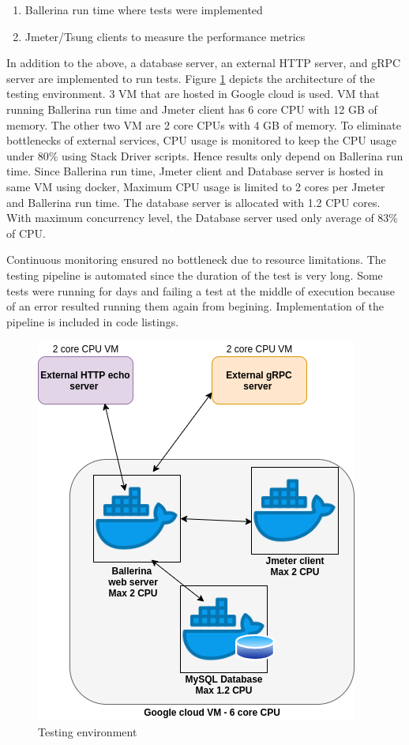 \begin{enumerate}
	\item Ballerina run time where tests were implemented
	\item Jmeter/Tsung clients to measure the performance metrics 
\end{enumerate}
	
In addition to the above, a database server, an external HTTP server, and gRPC server are implemented to run tests. Figure \ref{testing_env} depicts the architecture of the testing environment. 3  \acrfull{VM} that are hosted in Google cloud is used. VM that running Ballerina run time and Jmeter client has 6 core CPU with 12 GB of memory. The other two VM are 2 core CPUs with 4 GB of memory. To eliminate bottlenecks of external services, CPU usage is monitored to keep the CPU usage under 80\% using Stack Driver scripts. Hence results only depend on Ballerina run time. Since Ballerina run time, Jmeter client and Database server is hosted in same VM using docker, Maximum CPU usage is limited to 2 cores per Jmeter and Ballerina run time. The database server is allocated with 1.2 CPU cores. With maximum concurrency level, the Database server used only average of 83\% of CPU. 

Continuous monitoring ensured no bottleneck due to resource limitations. The testing pipeline is automated since the duration of the test is very long. Some tests were running for days and failing a test at the middle of execution because of an error resulted running them again from begining. Implementation of the pipeline is included in code listings.

\begin{figure}[htbp]
	\begin{center}
		\includegraphics[scale=0.5]{figures/Tes_env.png}
	\end{center}
	\caption{Testing environment}
	\label{testing_env}
\end{figure}

